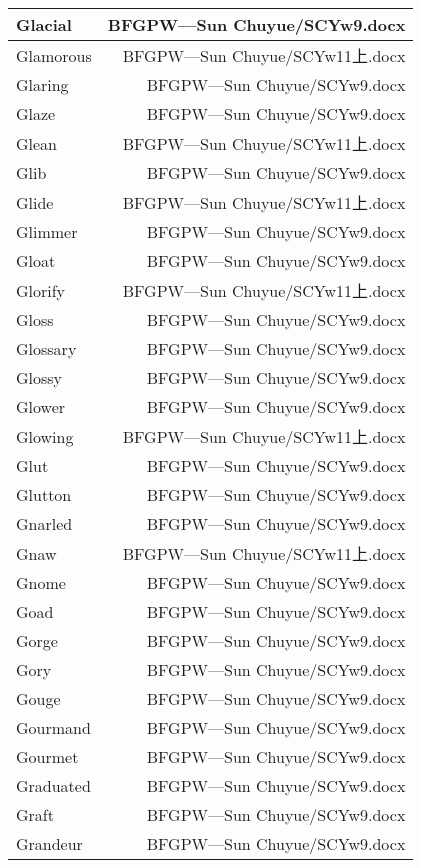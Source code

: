 \documentclass{article}
\begin{document}
\begin{center}
\begin{longtable}{|l|r|}
Glacial  &  BFGPW---Sun Chuyue/SCYw9.docx\\  
\hline
Glamorous  &  BFGPW---Sun Chuyue/SCYw11上.docx\\  
\hline
Glaring  &  BFGPW---Sun Chuyue/SCYw9.docx\\  
\hline
Glaze  &  BFGPW---Sun Chuyue/SCYw9.docx\\  
\hline
Glean  &  BFGPW---Sun Chuyue/SCYw11上.docx\\  
\hline
Glib  &  BFGPW---Sun Chuyue/SCYw9.docx\\  
\hline
Glide  &  BFGPW---Sun Chuyue/SCYw11上.docx\\  
\hline
Glimmer  &  BFGPW---Sun Chuyue/SCYw9.docx\\  
\hline
Gloat  &  BFGPW---Sun Chuyue/SCYw9.docx\\  
\hline
Glorify  &  BFGPW---Sun Chuyue/SCYw11上.docx\\  
\hline
Gloss  &  BFGPW---Sun Chuyue/SCYw9.docx\\  
\hline
Glossary  &  BFGPW---Sun Chuyue/SCYw9.docx\\  
\hline
Glossy  &  BFGPW---Sun Chuyue/SCYw9.docx\\  
\hline
Glower  &  BFGPW---Sun Chuyue/SCYw9.docx\\  
\hline
Glowing  &  BFGPW---Sun Chuyue/SCYw11上.docx\\  
\hline
Glut  &  BFGPW---Sun Chuyue/SCYw9.docx\\  
\hline
Glutton  &  BFGPW---Sun Chuyue/SCYw9.docx\\  
\hline
Gnarled  &  BFGPW---Sun Chuyue/SCYw9.docx\\  
\hline
Gnaw  &  BFGPW---Sun Chuyue/SCYw11上.docx\\  
\hline
Gnome  &  BFGPW---Sun Chuyue/SCYw9.docx\\  
\hline
Goad  &  BFGPW---Sun Chuyue/SCYw9.docx\\  
\hline
Gorge  &  BFGPW---Sun Chuyue/SCYw9.docx\\  
\hline
Gory  &  BFGPW---Sun Chuyue/SCYw9.docx\\  
\hline
Gouge  &  BFGPW---Sun Chuyue/SCYw9.docx\\  
\hline
Gourmand  &  BFGPW---Sun Chuyue/SCYw9.docx\\  
\hline
Gourmet  &  BFGPW---Sun Chuyue/SCYw9.docx\\  
\hline
Graduated  &  BFGPW---Sun Chuyue/SCYw9.docx\\  
\hline
Graft  &  BFGPW---Sun Chuyue/SCYw9.docx\\  
\hline
Grandeur  &  BFGPW---Sun Chuyue/SCYw9.docx\\  

\end{longtable}
\end{center}
\end{document}
